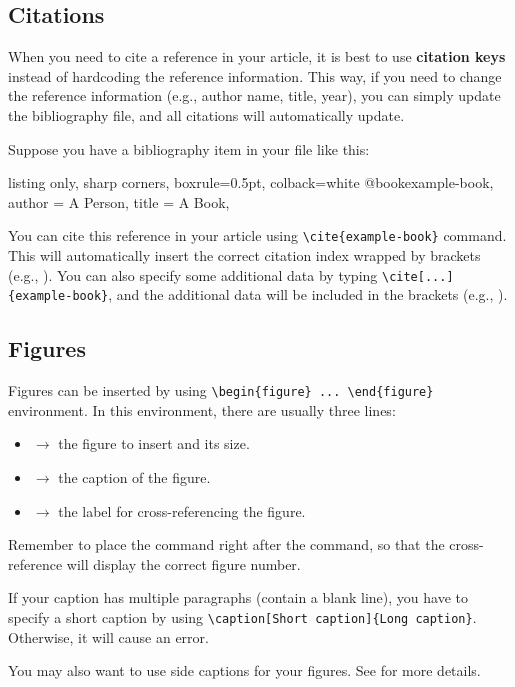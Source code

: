 \subsection{Citations}

When you need to cite a reference in your article, it is best to use \textbf{citation keys} instead of hardcoding the reference information. This way, if you need to change the reference information (e.g., author name, title, year), you can simply update the bibliography file, and all citations will automatically update.

Suppose you have a bibliography item in your  file like this:
\begin{tcblisting}{listing only, sharp corners, boxrule=0.5pt, colback=white}
@book{example-book,
  author = {A Person},
  title = {A Book},
}
\end{tcblisting}
You can cite this reference in your article using \verb|\cite{example-book}| command.
This will automatically insert the correct citation index wrapped by brackets (e.g., \cite{article-template}).
You can also specify some additional data by typing \verb|\cite[...]{example-book}|, and the additional data will be included in the brackets (e.g., \cite[Section 1]{article-template}).

\subsection{Figures}

Figures can be inserted by using \verb|\begin{figure} ... \end{figure}| environment.
In this environment, there are usually three lines:
\begin{itemize}
  \item {} $\to$ the figure to insert and its size.
  \item \macro{\caption} $\to$ the caption of the figure.
  \item \macro{\label} $\to$ the label for cross-referencing the figure.
\end{itemize}
Remember to place the \macro{\label} command right after the \macro{\caption} command, so that the cross-reference will display the correct figure number.

If your caption has multiple paragraphs (contain a blank line), you have to specify a short caption by using \verb|\caption[Short caption]{Long caption}|.
Otherwise, it will cause an error.

You may also want to use side captions for your figures.
See  for more details.
